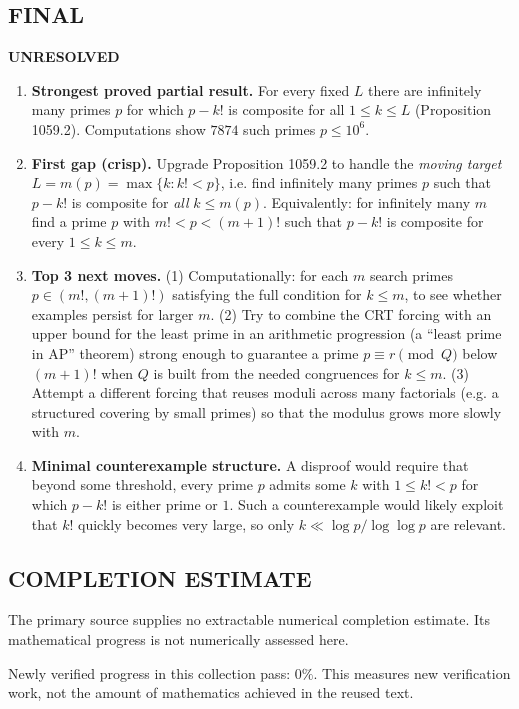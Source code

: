 \subsection*{FINAL}
\textbf{UNRESOLVED}
\begin{enumerate}
\item[(i)] \textbf{Strongest proved partial result.}
For every fixed $L$ there are infinitely many primes $p$ for which $p-k!$ is composite for all $1\le k\le L$ (Proposition 1059.2). Computations show $7874$ such primes $p\le 10^6$.
\item[(ii)] \textbf{First gap (crisp).}
Upgrade Proposition 1059.2 to handle the \emph{moving target} $L=m(p)=\max\{k:k!<p\}$, i.e. find infinitely many primes $p$ such that $p-k!$ is composite for \emph{all} $k\le m(p)$.
Equivalently: for infinitely many $m$ find a prime $p$ with $m!<p<(m+1)!$ such that $p-k!$ is composite for every $1\le k\le m$.
\item[(iii)] \textbf{Top 3 next moves.}
(1) Computationally: for each $m$ search primes $p\in(m!, (m+1)!)$ satisfying the full condition for $k\le m$, to see whether examples persist for larger $m$.
(2) Try to combine the CRT forcing with an upper bound for the least prime in an arithmetic progression (a ``least prime in AP'' theorem) strong enough to guarantee a prime $p\equiv r\pmod Q$ below $(m+1)!$ when $Q$ is built from the needed congruences for $k\le m$.
(3) Attempt a different forcing that reuses moduli across many factorials (e.g. a structured covering by small primes) so that the modulus grows more slowly with $m$.
\item[(iv)] \textbf{Minimal counterexample structure.}
A disproof would require that beyond some threshold, every prime $p$ admits some $k$ with $1\le k!<p$ for which $p-k!$ is either prime or $1$. Such a counterexample would likely exploit that $k!$ quickly becomes very large, so only $k\ll \log p/\log\log p$ are relevant.
\end{enumerate}




\subsection*{COMPLETION ESTIMATE}
The primary source supplies no extractable numerical completion estimate. Its mathematical progress is not numerically assessed here.

Newly verified progress in this collection pass: $0\%$. This measures new verification work, not the amount of mathematics achieved in the reused text.
